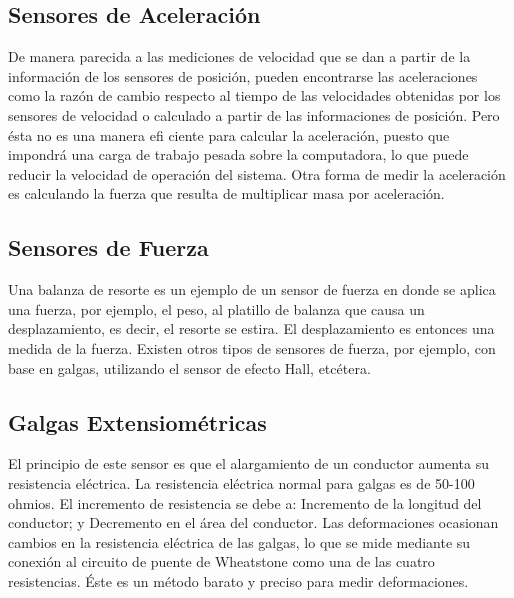 \subsection{\textbf{Sensores de Aceleración}}
De manera parecida a las mediciones de velocidad que se dan a partir de la información de los sensores de posición, pueden encontrarse las aceleraciones como la razón de cambio respecto al tiempo de las velocidades obtenidas por los sensores de velocidad o calculado a partir de las informaciones de posición. Pero ésta no es una manera efi ciente para calcular
la aceleración, puesto que impondrá una carga de trabajo pesada sobre la computadora, lo que puede reducir la velocidad de operación del sistema. Otra forma de medir la aceleración es calculando la fuerza que resulta de multiplicar masa por aceleración.

\subsection{\textbf{Sensores de Fuerza}}
Una balanza de resorte es un ejemplo de un sensor de fuerza en donde se aplica una fuerza, por ejemplo, el peso, al platillo de balanza que causa un desplazamiento, es decir, el resorte se estira. El desplazamiento es entonces una medida de la fuerza. Existen otros tipos de sensores de fuerza, por ejemplo, con base en galgas, utilizando el sensor de efecto Hall, etcétera.

\subsection*{\quad\textbf{Galgas Extensiométricas}}
El principio de este sensor es que el alargamiento de un conductor aumenta su resistencia eléctrica. La resistencia eléctrica normal para galgas es de 50-100 ohmios. El incremento de resistencia se debe a: Incremento de la longitud del conductor; y Decremento en el área del conductor. Las deformaciones ocasionan cambios en la resistencia eléctrica de las galgas, lo que se mide mediante su conexión al circuito de puente de Wheatstone como una de las cuatro resistencias. Éste es un método barato y preciso para medir deformaciones.

